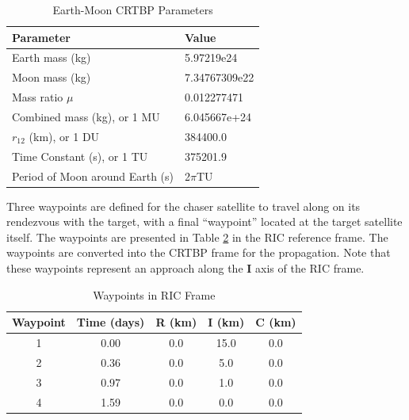\documentclass[a4paper]{article}
\begin{document}
\begin{table}[h] \label{tab:Environment_1}
	\begin{center}
		\begin{tabular}{l l}
			\toprule
			Parameter   & Value \\
			\midrule
			Earth mass (kg) & 5.97219e24 \\
			Moon mass (kg) & 7.34767309e22 \\
			Mass ratio \(\mu\)      & 0.012277471 \\
			Combined mass (kg), or 1 MU & 6.045667e+24 \\
			\(r_{12}\) (km), or 1 DU & 384400.0 \\
			Time Constant (s), or 1 TU & 375201.9 \\
			Period of Moon around Earth (s) & 2\(\pi\)TU \\
			\bottomrule
		\end{tabular}
		\caption{Earth-Moon CRTBP Parameters}
	\end{center}
\end{table}

Three waypoints are defined for the chaser satellite to travel along on its rendezvous with the target, with a final ``waypoint'' located at the target satellite itself.  The waypoints are presented in Table \ref{tab:Waypoints_1} in the RIC reference frame.  The waypoints are converted into the CRTBP frame for the propagation.  Note that these waypoints represent an approach along the \(\mathbf{I}\) axis of the RIC frame.  

\begin{table}[h] \label{tab:Waypoints_1}
	\begin{center}
		\begin{tabular}{ccccc}
			\toprule
			Waypoint   & Time (days) & R (km) & I (km) & C (km) \\
			\midrule
			1 & 0.00 & 0.0 & 15.0 & 0.0 \\
			2 & 0.36 & 0.0 & 5.0 & 0.0 \\
			3 & 0.97 & 0.0 & 1.0 & 0.0 \\
			4 & 1.59 & 0.0 & 0.0 & 0.0 \\
			\bottomrule
		\end{tabular}
		\caption{Waypoints in RIC Frame}
	\end{center}
\end{table}
\end{document}
